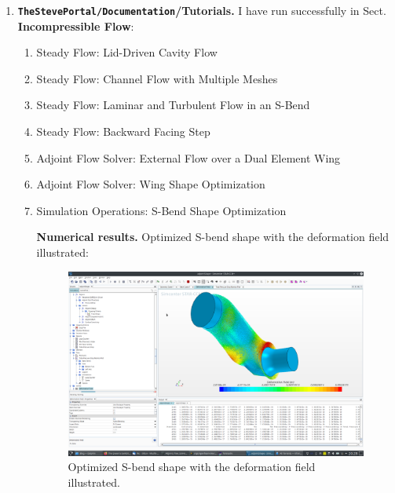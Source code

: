 \documentclass[onsided]{book}
\numberwithin{equation}{section}
\begin{document}
\begin{enumerate}
    $\to$ I am familiar to playing the Java macros\footnote{In the group \texttt{SOFTube} of OpenFOAM-based applications which will be addressed later, Martin Kanitsar used 12 Java macros:
    \begin{enumerate}
        \item For Topology Optimization \texttt{topoOpt}: \texttt{shapeGradientCCM}: the Java macros \texttt{ccmReplace.java, mbmw3host.java, mbmw3.java, mbmw3ds.java, mbmw3re.java, mbmw3rs.java, porous.java, porous0.java, porous1.java, wrapGeom.java} are used to interact with \textsc{Star-CCM+}.
        \item For Shape Optimization \texttt{shapeGradientCCM}: the Java macros \texttt{ccmReplace.java, mbmw3host.java, mbmw3.java, mbmw3ds.java, mbmw3re.java, mbmw3rs.java, solvePrimal.java, solveAdjoint.java} are used to interact with \textsc{Star-CCM+}.
    \end{enumerate}} in \textsc{Star-CCM+} (same for all versions).
    \item \textbf{\texttt{TheStevePortal/Documentation}/Tutorials.}  I have run successfully in Sect. \textbf{Incompressible Flow}:
    \begin{enumerate}
        \item Steady Flow: Lid-Driven Cavity Flow
        \item Steady Flow: Channel Flow with Multiple Meshes
        \item Steady Flow: Laminar and Turbulent Flow in an S-Bend
        \item Steady Flow: Backward Facing Step
        \item Adjoint Flow Solver: External Flow over a Dual Element Wing
        \item Adjoint Flow Solver: Wing Shape Optimization
        \item Simulation Operations: S-Bend Shape Optimization
        
        \textbf{Numerical results.} Optimized S-bend shape with the deformation field illustrated:
        
        \begin{figure}[H]
            \centering
            \includegraphics[height=0.44\textheight]{adjointShape_1}
            \caption{Optimized S-bend shape with the deformation field illustrated.}
        \end{figure}
        

\end{enumerate}
\end{enumerate}
\end{document}
